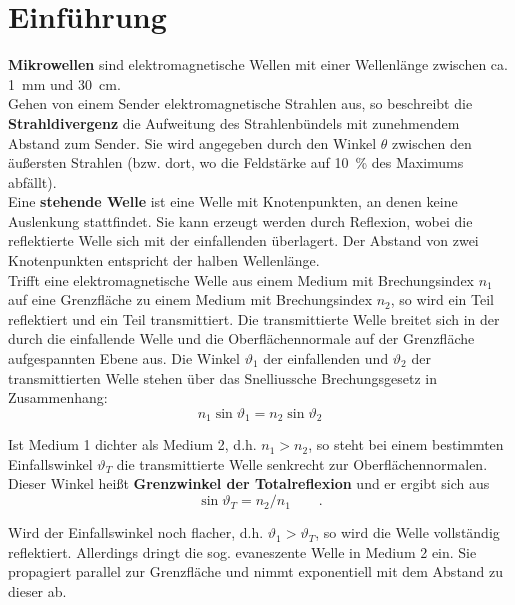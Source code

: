 \section{Einführung}
\textbf{Mikrowellen} sind elektromagnetische Wellen mit einer Wellenlänge zwischen ca. \SI{1}{mm} und \SI{30}{cm}.\\

Gehen von einem Sender elektromagnetische Strahlen aus, so beschreibt die \textbf{Strahldivergenz} die Aufweitung des Strahlenbündels mit zunehmendem Abstand zum Sender. Sie wird angegeben durch den Winkel $\theta$ zwischen den äußersten Strahlen (bzw. dort, wo die Feldstärke auf \SI{10}{\percent} des Maximums abfällt).\\

Eine \textbf{stehende Welle} ist eine Welle mit Knotenpunkten, an denen keine Auslenkung stattfindet. Sie kann erzeugt werden durch Reflexion, wobei die reflektierte Welle sich mit der einfallenden überlagert. Der Abstand von zwei Knotenpunkten entspricht der halben Wellenlänge.\\

Trifft eine elektromagnetische Welle aus einem Medium mit Brechungsindex $n_1$ auf eine Grenzfläche zu einem Medium mit Brechungsindex $n_2$, so wird ein Teil reflektiert und ein Teil transmittiert. Die transmittierte Welle breitet sich in der durch die einfallende Welle und die Oberflächennormale auf der Grenzfläche aufgespannten Ebene aus. Die Winkel $\vartheta_1$ der einfallenden und $\vartheta_2$ der transmittierten Welle stehen über das Snelliussche Brechungsgesetz in Zusammenhang:
\begin{equation}
	n_1\sin{\vartheta_1}=n_2\sin{\vartheta_2}
\label{eq:snellius}
\end{equation}

Ist Medium 1 dichter als Medium 2, d.h. $n_1>n_2$, so steht bei einem bestimmten Einfallswinkel $\vartheta_T$ die transmittierte Welle senkrecht zur Oberflächennormalen. Dieser Winkel heißt \textbf{Grenzwinkel der Totalreflexion} und er ergibt sich aus 
\begin{equation}
	\sin{\vartheta_T}=n_2/n_1\qquad .
\label{eq:total}
\end{equation}

Wird der Einfallswinkel noch flacher, d.h. $\vartheta_1>\vartheta_T$, so wird die Welle vollständig reflektiert. Allerdings dringt die sog. evaneszente Welle in Medium 2 ein. Sie propagiert parallel zur Grenzfläche und nimmt exponentiell mit dem Abstand zu dieser ab.


